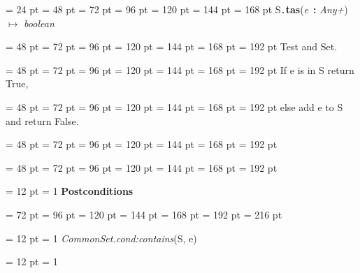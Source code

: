 {{\par}
{\par \noindent  \leftskip = 24 pt  \leftmargini = 48 pt  \leftmarginii = 72 pt  \leftmarginiii = 96 pt  \leftmarginiv = 120 pt  \leftmarginv = 144 pt  \leftmarginvi = 168 pt S{\tt .\/}{\bf {\large {\bf tas\/}}\/}({\em e\/}~{\bf :}  {\em Any+\/}) \(\mapsto \)  {\em boolean\/}{\par \noindent
{\par \noindent  \leftskip = 48 pt  \leftmargini = 72 pt  \leftmarginii = 96 pt  \leftmarginiii = 120 pt  \leftmarginiv = 144 pt  \leftmarginv = 168 pt  \leftmarginvi = 192 pt  Test and Set.\par}
{\par \noindent  \leftskip = 48 pt  \leftmargini = 72 pt  \leftmarginii = 96 pt  \leftmarginiii = 120 pt  \leftmarginiv = 144 pt  \leftmarginv = 168 pt  \leftmarginvi = 192 pt  If e is in S return True,\par}
{\par \noindent  \leftskip = 48 pt  \leftmargini = 72 pt  \leftmarginii = 96 pt  \leftmarginiii = 120 pt  \leftmarginiv = 144 pt  \leftmarginv = 168 pt  \leftmarginvi = 192 pt  else add e to S and return False.\par}
{\par \noindent  \leftskip = 48 pt  \leftmargini = 72 pt  \leftmarginii = 96 pt  \leftmarginiii = 120 pt  \leftmarginiv = 144 pt  \leftmarginv = 168 pt  \leftmarginvi = 192 pt {\par \noindent
\par}
\par}
{\par \noindent  \leftskip = 48 pt  \leftmargini = 72 pt  \leftmarginii = 96 pt  \leftmarginiii = 120 pt  \leftmarginiv = 144 pt  \leftmarginv = 168 pt  \leftmarginvi = 192 pt {\par \noindent
{\par \pagebreak[3.100000] \noindent \hangindent = 12 pt \hangafter = 1 
{\bf Postconditions\/}\par}
{\par \noindent  \leftskip = 72 pt  \leftmargini = 96 pt  \leftmarginii = 120 pt  \leftmarginiii = 144 pt  \leftmarginiv = 168 pt  \leftmarginv = 192 pt  \leftmarginvi = 216 pt {\par \noindent
{\par \pagebreak[3.000000] \noindent \hangindent = 12 pt \hangafter = 1 
 {\em CommonSet.cond:contains\/}(S, e)\par}
{\par \pagebreak[3.000000] \noindent \hangindent = 12 pt \hangafter = 1 
}}}}}}}}
